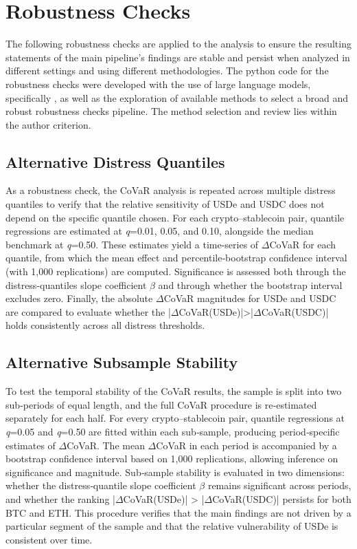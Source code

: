 \documentclass[12pt,a4paper,titlepage,oneside,english]{article}
\begin{document}
\section{Robustness Checks}
The following robustness checks are applied to the analysis to ensure the resulting statements of the main pipeline's findings are stable and persist when analyzed in different settings and using different methodologies. The python code for the robustness checks were developed with the use of large language models, specifically \parencite{claude_sonnet_2025}, as well as the exploration of available methods to select a broad and robust robustness checks pipeline. The method selection and review lies within the author criterion. 
\subsection{Alternative Distress Quantiles}
As a robustness check, the CoVaR analysis is repeated across multiple distress quantiles to verify that the relative sensitivity of USDe and USDC does not depend on the specific quantile chosen. For each crypto–stablecoin pair, quantile regressions are estimated at \textit{q}=0.01, 0.05, and 0.10, alongside the median benchmark at \textit{q}=0.50. These estimates yield a time-series of $\Delta$CoVaR for each quantile, from which the mean effect and percentile‑bootstrap confidence interval (with 1,000 replications) are computed. Significance is assessed both through the distress‑quantiles slope coefficient  $\beta$ and through whether the bootstrap interval excludes zero. Finally, the absolute $\Delta$CoVaR magnitudes for USDe and USDC are compared to evaluate whether the |$\Delta$CoVaR(USDe)|>|$\Delta$CoVaR(USDC)| holds consistently across all distress thresholds.

\subsection{Alternative Subsample Stability}
To test the temporal stability of the CoVaR results, the sample is split into two sub‑periods of equal length, and the full CoVaR procedure is re‑estimated separately for each half. For every crypto–stablecoin pair, quantile regressions at \textit{q}=0.05 and \textit{q}=0.50 are fitted within each sub‑sample, producing period‑specific estimates of $\Delta$CoVaR. The mean $\Delta$CoVaR in each period is accompanied by a bootstrap confidence interval based on 1,000 replications, allowing inference on significance and magnitude. Sub‑sample stability is evaluated in two dimensions: whether the distress‑quantile slope coefficient $\beta$ remains significant across periods, and whether the ranking |$\Delta$CoVaR(USDe)| > |$\Delta$CoVaR(USDC)| persists for both BTC and ETH. This procedure verifies that the main findings are not driven by a particular segment of the sample and that the relative vulnerability of USDe is consistent over time.
\end{document}
